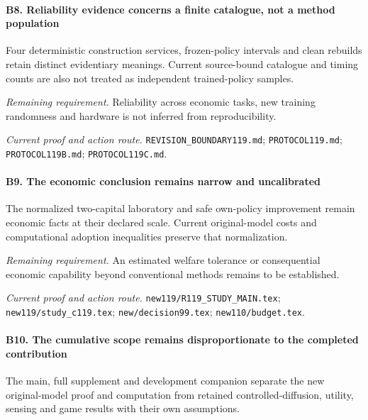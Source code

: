\paragraph{B8. Reliability evidence concerns a finite catalogue, not a method population}

Four deterministic construction services, frozen-policy intervals and clean rebuilds retain distinct evidentiary meanings. Current source-bound catalogue and timing counts are also not treated as independent trained-policy samples.

\par\emph{Remaining requirement.} Reliability across economic tasks, new training randomness and hardware is not inferred from reproducibility.

\par\emph{Current proof and action route.} \nolinkurl{REVISION_BOUNDARY119.md}; \nolinkurl{PROTOCOL119.md}; \nolinkurl{PROTOCOL119B.md}; \nolinkurl{PROTOCOL119C.md}.

\paragraph{B9. The economic conclusion remains narrow and uncalibrated}

The normalized two-capital laboratory and safe own-policy improvement remain economic facts at their declared scale. Current original-model costs and computational adoption inequalities preserve that normalization.

\par\emph{Remaining requirement.} An estimated welfare tolerance or consequential economic capability beyond conventional methods remains to be established.

\par\emph{Current proof and action route.} \nolinkurl{new119/R119_STUDY_MAIN.tex}; \nolinkurl{new119/study_c119.tex}; \nolinkurl{new/decision99.tex}; \nolinkurl{new110/budget.tex}.

\paragraph{B10. The cumulative scope remains disproportionate to the completed contribution}

The main, full supplement and development companion separate the new original-model proof and computation from retained controlled-diffusion, utility, sensing and game results with their own assumptions.

